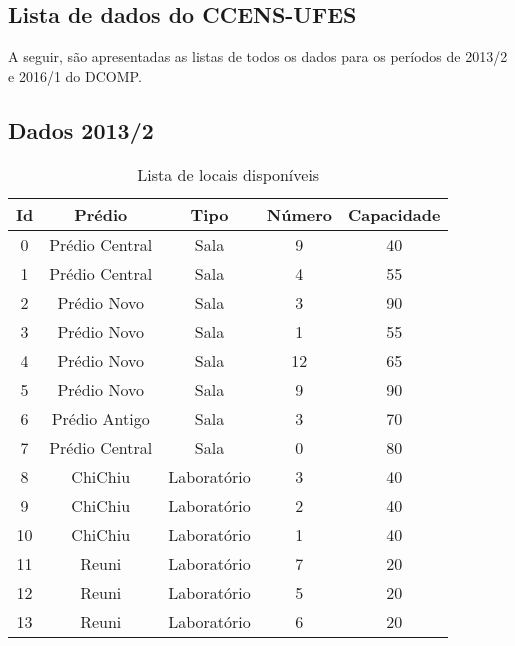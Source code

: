 \begin{apendices}

\chapter{Lista de dados do CCENS-UFES}
\label{ap-dados}
A seguir, são apresentadas as listas de todos os dados para os períodos de 2013/2 e 2016/1 do DCOMP.

\section{Dados 2013/2}
\label{dados_2013}

\begin{table}[H]
\footnotesize
\centering
\begin{tabular}{|c|c|c|c|c|}
\hline
\textbf{Id} & \textbf{Prédio} & \textbf{Tipo} & \textbf{Número} & \textbf{Capacidade} \\ \hline
0 & Prédio Central & Sala & 9 & 40 \\ \hline
1 & Prédio Central & Sala & 4 & 55 \\ \hline
2 & Prédio Novo & Sala & 3 & 90 \\ \hline
3 & Prédio Novo & Sala & 1 & 55 \\ \hline
4 & Prédio Novo & Sala & 12 & 65 \\ \hline
5 & Prédio Novo & Sala & 9 & 90 \\ \hline
6 & Prédio Antigo & Sala & 3 & 70 \\ \hline
7 & Prédio Central & Sala & 0 & 80 \\ \hline
8 & ChiChiu & Laboratório & 3 & 40 \\ \hline
9 & ChiChiu & Laboratório & 2 & 40 \\ \hline
10 & ChiChiu & Laboratório & 1 & 40 \\ \hline
11 & Reuni & Laboratório & 7 & 20 \\ \hline
12 & Reuni & Laboratório & 5 & 20 \\ \hline
13 & Reuni & Laboratório & 6 & 20 \\ \hline
\end{tabular}
\caption{Lista de locais disponíveis}
\label{ap-lista-locais-2013}
\end{table}


\end{apendices}

